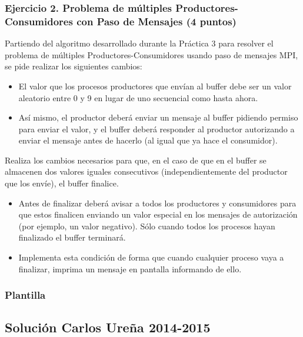 \documentclass[a4paper,12pt]{article}
\begin{document}
\subsubsection{Ejercicio 2. Problema de múltiples Productores-Consumidores con Paso de Mensajes (4 puntos)}

Partiendo del algoritmo desarrollado durante la Práctica 3 para resolver el problema de múltiples Productores-Consumidores usando paso de mensajes MPI, se pide realizar los siguientes cambios:
\begin{itemize}
    \item El valor que los procesos productores que envían al buffer debe ser un valor aleatorio entre 0 y 9 en lugar de uno secuencial como hasta ahora.
    \item Así mismo, el productor deberá enviar un mensaje al buffer pidiendo permiso para enviar el valor, y el buffer deberá responder al productor autorizando a enviar el mensaje antes de hacerlo (al igual que ya hace el consumidor).
\end{itemize}

Realiza los cambios necesarios para que, en el caso de que en el buffer se almacenen dos valores iguales consecutivos (independientemente del productor que los envíe), el buffer finalice.
\begin{itemize}
    \item Antes de finalizar deberá avisar a todos los productores y consumidores para que estos finalicen enviando un valor especial en los mensajes de autorización (por ejemplo, un valor negativo). Sólo cuando todos los procesos hayan finalizado el buffer terminará.
    \item Implementa esta condición de forma que cuando cualquier proceso vaya a finalizar, imprima un mensaje en pantalla informando de ello.
\end{itemize}

\subsubsection{Plantilla}




\subsection{Solución Carlos Ureña 2014-2015}
\end{document}
